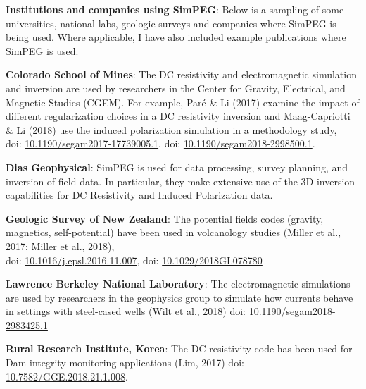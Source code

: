 \documentclass[a4paper, 11pt]{article}
\newcommand{\doi}[1]{doi: \href{https://doi.org/#1}{#1}}
\begin{document}
\textbf{Institutions and companies using SimPEG}: Below is a sampling of some universities, national labs, geologic surveys and companies where SimPEG is being used. Where applicable, I have also included example publications where SimPEG is used.
\begin{myitemize}\vspace{0.3cm}
\item \textbf{Colorado School of Mines}: The DC resistivity and electromagnetic simulation and inversion are used by researchers in the Center for Gravity, Electrical, and Magnetic Studies (CGEM). For example, Par\'e \& Li (2017) examine the impact of different regularization choices in a DC resistivity inversion and Maag-Capriotti \& Li (2018) use the induced polarization simulation in a methodology study, \\ \doi{10.1190/segam2017-17739005.1}, \doi{10.1190/segam2018-2998500.1}.

\item \textbf{Dias Geophysical}: SimPEG is used for data processing, survey planning, and inversion of field data. In particular, they make extensive use of the 3D inversion capabilities for DC Resistivity and Induced Polarization data.

\item \textbf{Geologic Survey of New Zealand}: The potential fields codes (gravity, magnetics, self-potential) have been used in volcanology studies (Miller et al., 2017; Miller et al., 2018), \\ \doi{10.1016/j.epsl.2016.11.007}, \doi{10.1029/2018GL078780}

\item \textbf{Lawrence Berkeley National Laboratory}: The electromagnetic simulations are used by researchers in the geophysics group to simulate how currents behave in settings with steel-cased wells (Wilt et al., 2018) \doi{10.1190/segam2018-2983425.1}

\item \textbf{Rural Research Institute, Korea}: The DC resistivity code has been used for Dam integrity monitoring applications (Lim, 2017) \doi{10.7582/GGE.2018.21.1.008}.




\end{myitemize}
\end{document}
